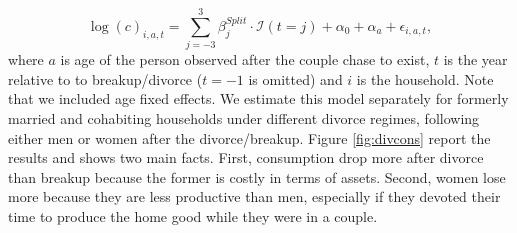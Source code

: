 \documentclass[12pt]{article}
\numberwithin{table}{section}
\begin{document}
\begin{equation}\label{eq:ev_studa2}
\log(c)_{i,a,t}=\sum_{j=-3}^{3}\beta^{Split}_j\cdot\mathcal{I}(t=j)+\alpha_{0}+\alpha_{a}+\epsilon_{i,a,t},
\end{equation}
where $a$ is age of the person observed after the couple chase to exist, $t$ is the year relative to to breakup/divorce ($t=-1$ is omitted) and $i$ is the household. Note that we included age fixed effects. We estimate this model separately for formerly married and cohabiting households under different divorce regimes, following either men or women after the divorce/breakup. Figure \ref{fig:divcons} report the results and shows two main facts. First, consumption drop more after divorce than breakup because the former is costly in terms of assets. Second, women lose more because they are less productive than men, especially if they devoted their time to produce the home good while they were in a couple.
\end{document}
